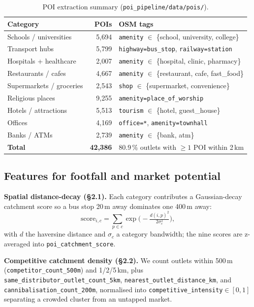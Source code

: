 \documentclass[10pt,a4paper]{article}
\begin{document}
\begin{table}[H]
\centering\footnotesize
\begin{tabularx}{\textwidth}{lrY}
\toprule
\textbf{Category} & \textbf{POIs} & \textbf{OSM tags}\\
\midrule
Schools / universities & 5,694 & \texttt{amenity} $\in$ \{school, university, college\}\\
Transport hubs & 5,799 & \texttt{highway=bus\_stop}, \texttt{railway=station}\\
Hospitals + healthcare & 2,007 & \texttt{amenity} $\in$ \{hospital, clinic, pharmacy\}\\
Restaurants / cafes & 4,667 & \texttt{amenity} $\in$ \{restaurant, cafe, fast\_food\}\\
Supermarkets / groceries & 2,543 & \texttt{shop} $\in$ \{supermarket, convenience\}\\
Religious places & 9,255 & \texttt{amenity=place\_of\_worship}\\
Hotels / attractions & 5,513 & \texttt{tourism} $\in$ \{hotel, guest\_house\}\\
Offices & 4,169 & \texttt{office=*}, \texttt{amenity=townhall}\\
Banks / ATMs & 2,739 & \texttt{amenity} $\in$ \{bank, atm\}\\
\midrule
\textbf{Total} & \textbf{42,386} & 80.9\,\% outlets with $\ge1$ POI within 2\,km\\
\bottomrule
\end{tabularx}
\caption{POI extraction summary (\texttt{poi\_pipeline/data/pois/}).}
\end{table}

\subsection{Features for footfall and market potential}
\textbf{Spatial distance-decay (\S2.1).} Each category contributes a
Gaussian-decay catchment score so a bus stop 20\,m away dominates one 400\,m away:
\[
\text{score}_{i,c}=\sum_{p\in c}\exp\!\Big(-\tfrac{d(i,p)^2}{2\sigma_c^2}\Big),
\]
with $d$ the haversine distance and $\sigma_c$ a category bandwidth; the nine
scores are z-averaged into \texttt{poi\_catchment\_score}.

\textbf{Competitive catchment density (\S2.2).} We count outlets within 500\,m
(\texttt{competitor\_count\_500m}) and 1/2/5\,km, plus
\texttt{same\_distributor\_outlet\_count\_5km},
\texttt{nearest\_outlet\_distance\_km}, and \texttt{cannibalisation\_count\_200m},
normalised into \texttt{competitive\_intensity}$\in[0,1]$ separating a crowded
cluster from an untapped market.
\end{document}
